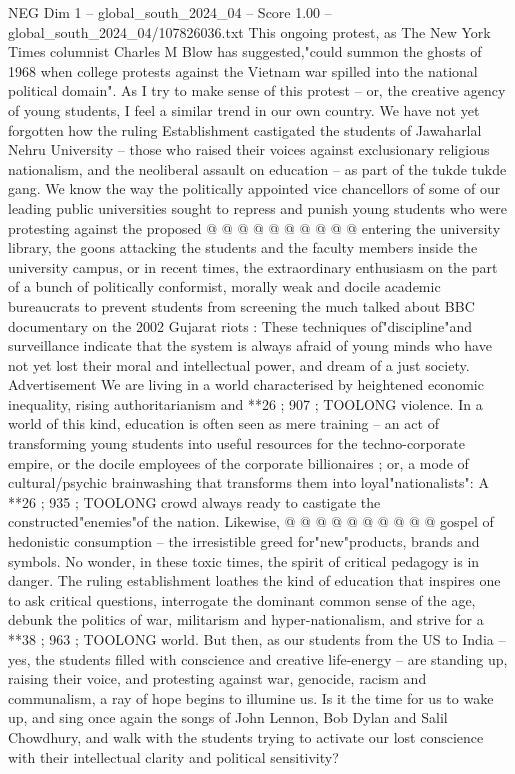 \begin{textsample}{NEG Dim 1 – global\_south\_2024\_04 – Score 1.00 – global\_south\_2024\_04/107826036.txt}
This ongoing protest, as The New York Times columnist Charles M Blow has suggested,"could summon the ghosts of 1968 when college protests against the Vietnam war spilled into the national political domain".
As I try to make sense of this protest -- or, the creative agency of young students, I feel a similar trend in our own country.
We have not yet forgotten how the ruling Establishment castigated the students of Jawaharlal Nehru University -- those who raised their voices against exclusionary religious nationalism, and the neoliberal assault on education -- as part of the tukde tukde gang.
We know the way the politically appointed vice chancellors of some of our leading public universities sought to repress and punish young students who were protesting against the proposed @ @ @ @ @ @ @ @ @ @ entering the university library, the goons attacking the students and the faculty members inside the university campus, or in recent times, the extraordinary enthusiasm on the part of a bunch of politically conformist, morally weak and docile academic bureaucrats to prevent students from screening the much talked about BBC documentary on the 2002 Gujarat riots : These techniques of"discipline"and surveillance indicate that the system is always afraid of young minds who have not yet lost their moral and intellectual power, and dream of a just society.
Advertisement We are living in a world characterised by heightened economic inequality, rising authoritarianism and **26 ; 907 ; TOOLONG violence.
In a world of this kind, education is often seen as mere training -- an act of transforming young students into useful resources for the techno-corporate empire, or the docile employees of the corporate billionaires ; or, a mode of cultural/psychic brainwashing that transforms them into loyal"nationalists": A **26 ; 935 ; TOOLONG crowd always ready to castigate the constructed"enemies"of the nation.
Likewise, @ @ @ @ @ @ @ @ @ @ gospel of hedonistic consumption -- the irresistible greed for"new"products, brands and symbols.
No wonder, in these toxic times, the spirit of critical pedagogy is in danger.
The ruling establishment loathes the kind of education that inspires one to ask critical questions, interrogate the dominant common sense of the age, debunk the politics of war, militarism and hyper-nationalism, and strive for a **38 ; 963 ; TOOLONG world.
But then, as our students from the US to India -- yes, the students filled with conscience and creative life-energy -- are standing up, raising their voice, and protesting against war, genocide, racism and communalism, a ray of hope begins to illumine us.
Is it the time for us to wake up, and sing once again the songs of John Lennon, Bob Dylan and Salil Chowdhury, and walk with the students trying to activate our lost conscience with their intellectual clarity and political sensitivity?

\end{textsample}
